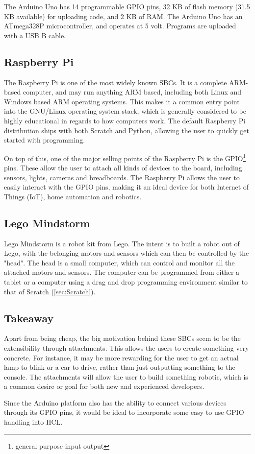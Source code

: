 The Arduino Uno has 14 programmable GPIO pins, 32 KB of flash memory (31.5 KB available) for uploading code, and 2 KB of RAM.
The Arduino Uno has an ATmega328P microcontroller, and operates at 5 volt.
Programs are uploaded with a USB B cable.

\subsection{Raspberry Pi}
The Raspberry Pi is one of the most widely known SBCs.
It is a complete ARM-based computer, and may run anything ARM based, including both Linux and Windows based ARM operating systems.
This makes it a common entry point into the GNU/Linux operating system stack, which is generally considered to be highly educational in regards to how computers work.
The default Raspberry Pi distribution ships with both Scratch and Python, allowing the user to quickly get started with programming\cite{RaspberryPi}.

On top of this, one of the major selling points of the Raspberry Pi is the GPIO\footnote{general purpose input output} pins.
These allow the user to attach all kinds of devices to the board, including sensors, lights, cameras and breadboards.
The Raspberry Pi allows the user to easily interact with the GPIO pins, making it an ideal device for both Internet of Things (IoT), home automation and robotics\cite{RaspberryPi}.

\subsection{Lego Mindstorm}
Lego Mindstorm is a robot kit from Lego.
The intent is to built a robot out of Lego, with the belonging motors and sensors which can then be controlled by the "head".
The head is a small computer, which can control and monitor all the attached motors and sensors.
The computer can be programmed from either a tablet or a computer using a drag and drop programming environment similar to that of Scratch (\ref{sec:Scratch})\cite{LegoMindstorms}.

\subsection{Takeaway}
Apart from being cheap, the big motivation behind these SBCs seem to be the extensibility through attachments.
This allows the users to create something very concrete.
For instance, it may be more rewarding for the user to get an actual lamp to blink or a car to drive, rather than just outputting something to the console.
The attachments will allow the user to build something robotic, which is a common desire or goal for both new and experienced developers\cite{EducationalRobotics}.

Since the Arduino platform also has the ability to connect various devices through its GPIO pins, it would be ideal to incorporate some easy to use GPIO handling into HCL.
